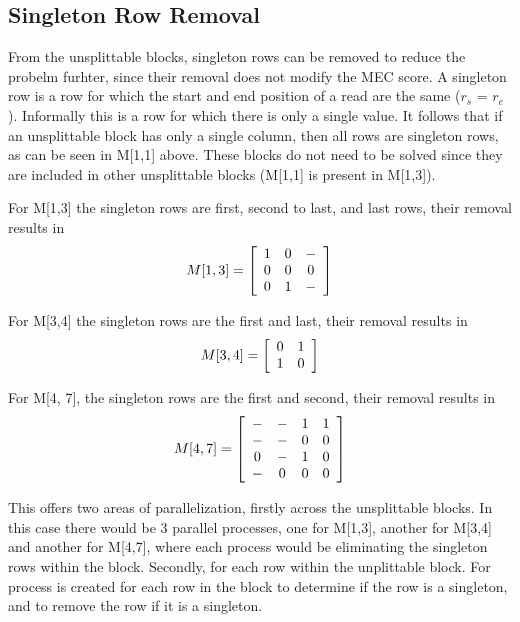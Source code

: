 \documentclass[10pt,a4paer,twocolumn]{article}
\begin{document}
\subsection{Singleton Row Removal}

From the unsplittable blocks, singleton rows can be removed to reduce the probelm furhter, since their removal
does not modify the MEC score. A singleton row is a row for which the start and end position of a read are the
same ($r_s$ = $r_e$). Informally this is a row for which there is only a single value. It follows that if an
unsplittable block has only a single column, then all rows are singleton rows, as can be seen in M[1,1] above.
These blocks do not need to be solved since they are included in other unsplittable blocks (M[1,1] is present
in M[1,3]).

For M[1,3] the singleton rows are first, second to last, and last rows, their removal results in
\begin{equation*}
    M[1,3] = \left[ \begin{array}{c c c}
            1   & 0     & -     \\
            0   & 0     & 0     \\
            0   & 1     & - 
    \end{array} \right]
\end{equation*}

For M[3,4] the singleton rows are the first and last, their removal results in 
\begin{equation*}
    M[3,4] = \left[ \begin{array}{c c}
            0   & 1     \\
            1   & 0     
    \end{array} \right]
\end{equation*}

For M[4, 7], the singleton rows are the first and second, their removal results in
\begin{equation*}
    M[4,7] = \left[ \begin{array}{c c c c}
            -   & -     & 1     & 1     \\
            -   & -     & 0     & 0     \\
            0   & -     & 1     & 0     \\
            -   & 0     & 0     & 0     
    \end{array} \right]
\end{equation*}

This offers two areas of parallelization, firstly across the unsplittable blocks. In this case there would be
3 parallel processes, one for M[1,3], another for M[3,4] and another for M[4,7], where each process would be
eliminating the singleton rows within the block. Secondly, for each row within the unplittable block. For
process is created for each row in the block to determine if the row is a singleton, and to remove the row 
if it is a singleton.
\end{document}
